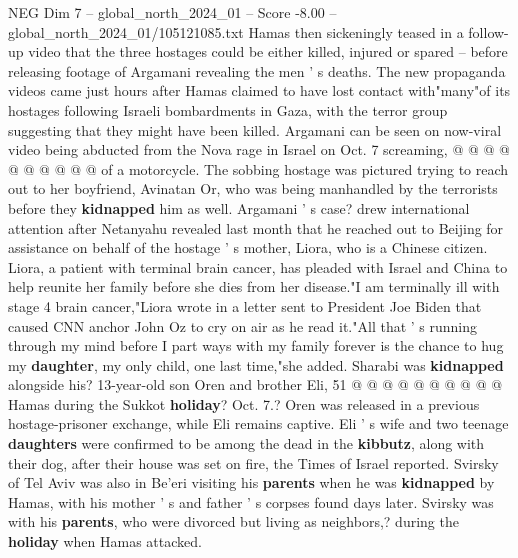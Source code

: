 \begin{textsample}{NEG Dim 7 – global\_north\_2024\_01 – Score -8.00 – global\_north\_2024\_01/105121085.txt}
Hamas then sickeningly teased in a follow-up video that the three hostages could be either killed, injured or spared -- before releasing footage of Argamani revealing the men ' s deaths.
The new propaganda videos came just hours after Hamas claimed to have lost contact with"many"of its hostages following Israeli bombardments in Gaza, with the terror group suggesting that they might have been killed.
Argamani can be seen on now-viral video being abducted from the Nova rage in Israel on Oct. 7 screaming, @ @ @ @ @ @ @ @ @ @ of a motorcycle.
The sobbing hostage was pictured trying to reach out to her boyfriend, Avinatan Or, who was being manhandled by the terrorists before they \textbf{kidnapped} him as well.
Argamani ' s case? drew international attention after Netanyahu revealed last month that he reached out to Beijing for assistance on behalf of the hostage ' s mother, Liora, who is a Chinese citizen.
Liora, a patient with terminal brain cancer, has pleaded with Israel and China to help reunite her family before she dies from her disease."I am terminally ill with stage 4 brain cancer,"Liora wrote in a letter sent to President Joe Biden that caused CNN anchor John Oz to cry on air as he read it."All that ' s running through my mind before I part ways with my family forever is the chance to hug my \textbf{daughter}, my only child, one last time,"she added.
Sharabi was \textbf{kidnapped} alongside his? 13-year-old son Oren and brother Eli, 51 @ @ @ @ @ @ @ @ @ @ Hamas during the Sukkot \textbf{holiday}?
Oct. 7.?
Oren was released in a previous hostage-prisoner exchange, while Eli remains captive.
Eli ' s wife and two teenage \textbf{daughters} were confirmed to be among the dead in the \textbf{kibbutz}, along with their dog, after their house was set on fire, the Times of Israel reported.
Svirsky of Tel Aviv was also in Be'eri visiting his \textbf{parents} when he was \textbf{kidnapped} by Hamas, with his mother ' s and father ' s corpses found days later.
Svirsky was with his \textbf{parents}, who were divorced but living as neighbors,? during the \textbf{holiday} when Hamas attacked.

\end{textsample}
